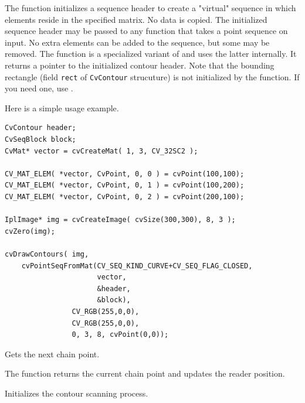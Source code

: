 The function initializes a sequence
header to create a "virtual" sequence in which elements reside in
the specified matrix. No data is copied. The initialized sequence
header may be passed to any function that takes a point sequence
on input. No extra elements can be added to the sequence,
but some may be removed. The function is a specialized variant of
 and uses
the latter internally. It returns a pointer to the initialized contour
header. Note that the bounding rectangle (field \texttt{rect} of
\texttt{CvContour} strucuture) is not initialized by the function. If
you need one, use .

Here is a simple usage example.

\begin{lstlisting}
CvContour header;
CvSeqBlock block;
CvMat* vector = cvCreateMat( 1, 3, CV_32SC2 );

CV_MAT_ELEM( *vector, CvPoint, 0, 0 ) = cvPoint(100,100);
CV_MAT_ELEM( *vector, CvPoint, 0, 1 ) = cvPoint(100,200);
CV_MAT_ELEM( *vector, CvPoint, 0, 2 ) = cvPoint(200,100);

IplImage* img = cvCreateImage( cvSize(300,300), 8, 3 );
cvZero(img);

cvDrawContours( img,
    cvPointSeqFromMat(CV_SEQ_KIND_CURVE+CV_SEQ_FLAG_CLOSED,
                      vector,
                      &header,
                      &block),
                CV_RGB(255,0,0),
                CV_RGB(255,0,0),
                0, 3, 8, cvPoint(0,0));
\end{lstlisting}


Gets the next chain point.


\begin{description}
\end{description}

The function returns the current chain point and updates the reader position.

Initializes the contour scanning process.


